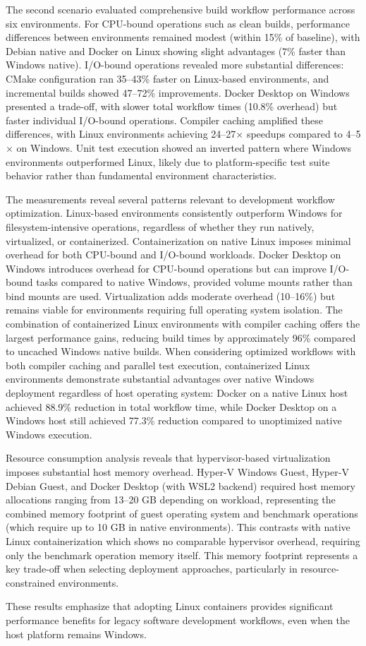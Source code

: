 The second scenario evaluated comprehensive build workflow performance across six environments.
For CPU-bound operations such as clean builds, performance differences between environments remained modest (within 15\% of baseline), with Debian native and Docker on Linux showing slight advantages (7\% faster than Windows native).
I/O-bound operations revealed more substantial differences: CMake configuration ran 35--43\% faster on Linux-based environments, and incremental builds showed 47--72\% improvements.
Docker Desktop on Windows presented a trade-off, with slower total workflow times (10.8\% overhead) but faster individual I/O-bound operations.
Compiler caching amplified these differences, with Linux environments achieving 24--27$\times$ speedups compared to 4--5$\times$ on Windows.
Unit test execution showed an inverted pattern where Windows environments outperformed Linux, likely due to platform-specific test suite behavior rather than fundamental environment characteristics.

The measurements reveal several patterns relevant to development workflow optimization.
Linux-based environments consistently outperform Windows for filesystem-intensive operations, regardless of whether they run natively, virtualized, or containerized.
Containerization on native Linux imposes minimal overhead for both CPU-bound and I/O-bound workloads.
Docker Desktop on Windows introduces overhead for CPU-bound operations but can improve I/O-bound tasks compared to native Windows, provided volume mounts rather than bind mounts are used.
Virtualization adds moderate overhead (10--16\%) but remains viable for environments requiring full operating system isolation.
The combination of containerized Linux environments with compiler caching offers the largest performance gains, reducing build times by approximately 96\% compared to uncached Windows native builds.
When considering optimized workflows with both compiler caching and parallel test execution, containerized Linux environments demonstrate substantial advantages over native Windows deployment regardless of host operating system: Docker on a native Linux host achieved 88.9\% reduction in total workflow time, while Docker Desktop on a Windows host still achieved 77.3\% reduction compared to unoptimized native Windows execution.

Resource consumption analysis reveals that hypervisor-based virtualization imposes substantial host memory overhead.
Hyper-V Windows Guest, Hyper-V Debian Guest, and Docker Desktop (with WSL2 backend) required host memory allocations ranging from 13--20 GB depending on workload, representing the combined memory footprint of guest operating system and benchmark operations (which require up to 10 GB in native environments).
This contrasts with native Linux containerization which shows no comparable hypervisor overhead, requiring only the benchmark operation memory itself.
This memory footprint represents a key trade-off when selecting deployment approaches, particularly in resource-constrained environments.

These results emphasize that adopting Linux containers provides significant performance benefits for legacy software development workflows, even when the host platform remains Windows.

